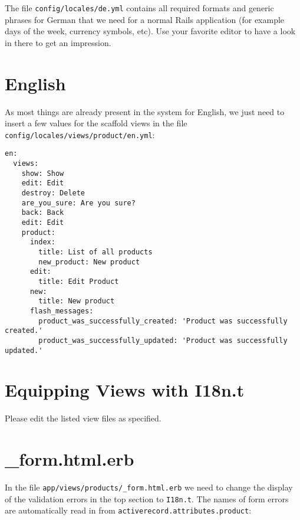 \documentclass[a4paper]{book}
\begin{document}
The file \texttt{config/locales/de.yml} contains all required formats and generic phrases for German that we need for a normal Rails application (for example days of the week, currency symbols, etc). Use your favorite editor to have a look in there to get an impression.

\section{English}\label{english}

As most things are already present in the system for English, we just need to insert a few values for the scaffold views in the file \texttt{config/locales/views/product/en.yml}:

\begin{shaded}\begin{verbatim}
en:
  views:
    show: Show
    edit: Edit
    destroy: Delete
    are_you_sure: Are you sure?
    back: Back
    edit: Edit
    product:
      index:
        title: List of all products
        new_product: New product
      edit:
        title: Edit Product
      new:
        title: New product
      flash_messages:
        product_was_successfully_created: 'Product was successfully created.'
        product_was_successfully_updated: 'Product was successfully updated.'
\end{verbatim}\end{shaded}

\section{Equipping Views with I18n.t}\label{equipping-views-with-i18n.t}

Please edit the listed view files as specified.

\section{\_form.html.erb}\label{form.html.erb}

In the file \texttt{app/views/products/\_form.html.erb} we need to change the display of the validation errors in the top section to \texttt{I18n.t}. The names of form errors are automatically read in from \texttt{activerecord.attributes.product}:
\end{document}
